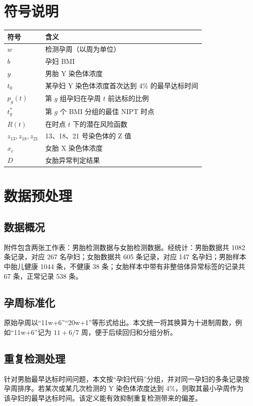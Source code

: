 ﻿\documentclass[12pt,a4paper]{article}
\begin{document}
\section{符号说明}
\begin{table}[H]
    \centering
    \begin{tabular}{>{\centering\arraybackslash}m{2.5cm} m{9.5cm}}
        \toprule
        符号 & 含义 \\
        \midrule
        $w$ & 检测孕周（以周为单位） \\
        $b$ & 孕妇 BMI \\
        $y$ & 男胎 Y 染色体浓度 \\
        $t_0$ & 某孕妇 Y 染色体浓度首次达到 4\% 的最早达标时间 \\
        $p_g(t)$ & 第 $g$ 组孕妇在孕周 $t$ 前达标的比例 \\
        $t_g^*$ & 第 $g$ 个 BMI 分组的最佳 NIPT 时点 \\
        $R(t)$ & 在时点 $t$ 下的潜在风险函数 \\
        $z_{13},z_{18},z_{21}$ & 13、18、21 号染色体的 Z 值 \\
        $x_c$ & 女胎 X 染色体浓度 \\
        $D$ & 女胎异常判定结果 \\
        \bottomrule
    \end{tabular}
\end{table}

\section{数据预处理}
\subsection{数据概况}
附件包含两张工作表：男胎检测数据与女胎检测数据。经统计：男胎数据共 1082 条记录，对应 267 名孕妇；女胎数据共 605 条记录，对应 147 名孕妇；男胎样本中胎儿健康 1044 条，不健康 38 条；女胎样本中带有非整倍体异常标签的记录共 67 条，正常记录 538 条。

\subsection{孕周标准化}
原始孕周以“11w+6”“20w+1”等形式给出。本文统一将其换算为十进制周数，例如“11w+6”记为 $11+6/7$ 周，便于后续回归和分组分析。

\subsection{重复检测处理}
针对男胎最早达标时间问题，本文按“孕妇代码”分组，并对同一孕妇的多条记录按孕周排序。若某次或某几次检测的 Y 染色体浓度达到 4\%，则取其最小孕周作为该孕妇的最早达标时间。该定义能有效抑制重复检测带来的偏差。
\end{document}
